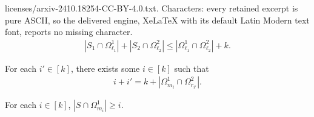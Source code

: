 \documentclass[10pt,a4paper]{amsart}
\newcommand{\Og}{\Omega}
\begin{document}
licenses/arxiv-2410.18254-CC-BY-4.0.txt. Characters: every retained excerpt is pure ASCII, so the delivered engine, XeLaTeX with its default Latin Modern text font, reports no missing character.
\begin{align}
\label{eq: comb align cons reduced}
|S_1 \cap \Og^1_{\ell_1}| + |S_2 \cap \Og^2_{\ell_2}| \leq | \Og^{1}_{\ell_1} \cap \Og^{2}_{\ell_2} | + k.
\end{align}

\begin{lem}
\label{lem: minimality implies equalities}
For each \(i' \in [k]\), there exists some \(i \in [k]\) such that 
\begin{gather}
i + i' = k + | \Og^1_{m_i} \cap \Og^2_{r_{i'}}|.
\end{gather}
\end{lem}

\begin{lem}
\label{lem: the other foot}
For each \(i \in [k]\), \(| S \cap \Og^1_{m_i}| \geq i\).    
\end{lem}
\end{document}
